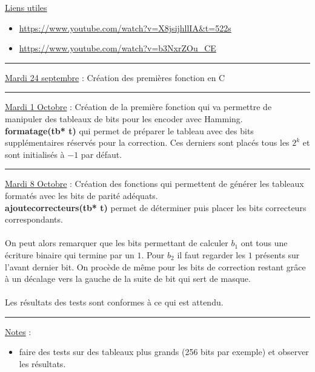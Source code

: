 \documentclass{article}
\begin{document}
\underline{Liens utiles}
\begin{itemize}
	\item \url{https://www.youtube.com/watch?v=X8jsijhllIA&t=522s}
	\item \url{https://www.youtube.com/watch?v=b3NxrZOu_CE}\\
\end{itemize}
	
\begin{center}
	\rule{0.5\linewidth}{1pt}
\end{center}

\underline{Mardi 24 septembre} : Création des premières fonction en C \\

\begin{center}
	\rule{0.5\linewidth}{1pt}
\end{center}


\underline{Mardi 1 Octobre} : Création de la première fonction qui va permettre de manipuler des tableaux de bits pour les encoder avec Hamming. \\

\textbf{formatage(tb* t)} qui permet de préparer le tableau avec des bits supplémentaires réservés pour la correction. Ces derniers sont placés tous les $2^k$ et sont initialisés à $-1$ par défaut.\\

\begin{center}
	\rule{0.5\linewidth}{1pt}
\end{center}

\underline{Mardi 8 Octobre} : Création des fonctions qui permettent de générer les tableaux formatés avec les bits de parité adéquats.\\

\textbf{ajoute\textunderscore correcteurs(tb* t)} permet de déterminer puis placer les bits correcteurs correspondants.\\\\
On peut alors remarquer que les bits permettant de calculer $b_1$ ont tous une écriture binaire qui termine par un $1$. 
Pour $b_2$ il faut regarder les $1$ présents sur l'avant dernier bit.
On procède de même pour les bits de correction restant grâce à un décalage vers la gauche de la suite de bit qui sert de masque.\\\\
Les résultats des tests sont conformes à ce qui est attendu. \\

\begin{center}
	\rule{0.5\linewidth}{1pt}
\end{center}

\underline{Notes} : 
\begin{itemize}
	\item faire des tests sur des tableaux plus grands (256 bits par exemple) et observer les résultats.
\end{itemize}
\end{document}
